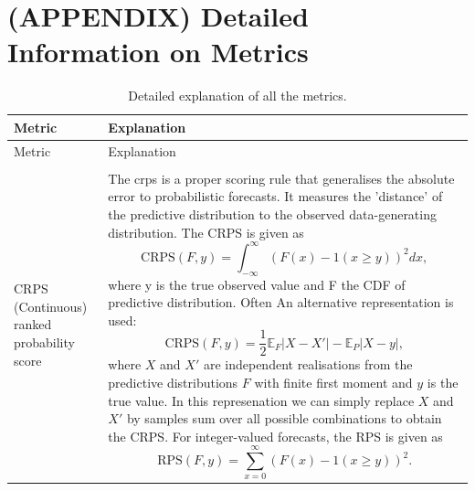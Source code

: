 \documentclass[
]{jss}
\begin{document}
\newpage

\appendix

\hypertarget{appendix-detailed-information-on-metrics}{%
\section*{(APPENDIX) Detailed Information on
Metrics}\label{appendix-detailed-information-on-metrics}}

\begin{CodeChunk}

\begin{longtable}[t]{>{\raggedright\arraybackslash}p{1.1in}>{\raggedright\arraybackslash}p{4.625in}}
\toprule
Metric & Explanation\\
\midrule
\endfirsthead
\toprule
Metric & Explanation\\
\midrule
\endhead

\noalign{\vskip 6mm}
\caption{Detailed explanation of all the metrics.}\\
\endfoot
\bottomrule
\endlastfoot
CRPS (Continuous) ranked probability score & The crps is a proper scoring rule that generalises the absolute error to probabilistic forecasts. It measures the 'distance' of the predictive distribution to the observed data-generating distribution. The CRPS is given as
  $$\text{CRPS}(F, y) = \int_{-\infty}^\infty \left( F(x) - 1(x \geq y) \right)^2 dx,$$
  where y is the true observed value and F the CDF of predictive distribution. Often An alternative representation is used:
  $$ \text{CRPS}(F, y) = \frac{1}{2} \mathbb{E}_{F} |X - X'| - \mathbb{E}_P |X - y|,$$ where $X$ and $X'$ are independent realisations from the predictive distributions $F$ with finite first moment and $y$ is the true value. In this represenation we can simply replace $X$ and $X'$ by samples sum over all possible combinations to obtain the CRPS.
  For integer-valued forecasts, the RPS is given as
  $$ \text{RPS}(F, y) = \sum_{x = 0}^\infty (F(x) - 1(x \geq y))^2. $$


\end{longtable}
\end{CodeChunk}
\end{document}
